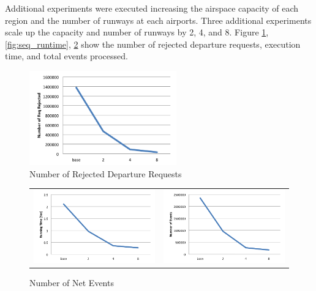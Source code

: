 Additional experiments were executed increasing the airspace capacity of each region and
the number of runways at each airports. Three additional experiments scale up the capacity
and number of runways by 2, 4, and 8. Figure \ref{fig:seq_req_rejected}, \ref{fig:seq_runtime}, \ref{fig:seq_events} show the number of rejected
departure requests, execution time, and total events processed.



\begin{figure} [htd]
\centering
\includegraphics[width=2.5in]{figs/seq_req_rejected.png}
\caption{Number of Rejected Departure Requests}
\label{fig:seq_req_rejected}
\end{figure}

\begin{figure}
\centering
\begin{tabular}{cc}
\begin{minipage}{200pt}
\includegraphics[width=200pt]{figs/seq_runtime.png}
\caption{Sequential Execution Time}
\label{fig:seq_runtime}
\end{minipage}
&
\begin{minipage}{200pt}
\includegraphics[width=200pt]{figs/seq_events.png}
\caption{Number of Net Events}
\label{fig:seq_events}
\end{minipage}
\end{tabular}
\end{figure}



